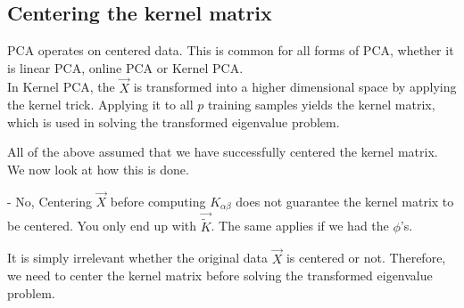 \subsection{Centering the kernel matrix}

\label{sec:centerkernel}

\begin{frame}{\subsecname}

PCA operates on centered data. This is common for all forms  of PCA, 
whether it is linear PCA, online PCA or Kernel PCA.\\
In Kernel PCA, the $\vec X$ is transformed into a higher dimensional space by applying the kernel trick.
Applying it to all $p$ training samples yields the kernel matrix, which is used in solving the transformed eigenvalue problem.

All of the above assumed that we have successfully centered the kernel matrix. We now look at how this is done.

\end{frame}


\begin{frame}{\subsecname}



\pause

- No, Centering $\vec X$ before computing $K_{\alpha \beta}$ does not guarantee the kernel matrix to be centered. You only end up with $\vec{\widetilde K}$. The same applies if we had the $\phi$'s.

It is simply irrelevant whether the original data $\vec X$ is centered or not. 
Therefore, we need to center the kernel matrix before solving the transformed eigenvalue problem.\\

\end{frame}

